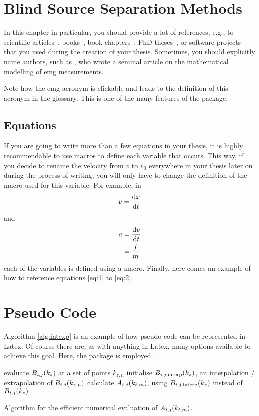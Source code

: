 \section{Blind Source Separation Methods}
In this chapter in particular, you should provide a lot of references, e.g., to scientific articles~\cite{farina99}, books~\cite{plonsey07}, book chapters~\cite{rodriguez-falces12}, PhD theses~\cite{fevotte03}, or software projects~\cite{r-project} that you used during the creation of your thesis.
Sometimes, you should explicitly name authors, such as \textcite{farina99}, who wrote a seminal article on the mathematical modelling of \gls{emg} measurements.

Note how the \gls{emg} acronym is clickable and leads to the definition of this acronym in the glossary.
This is one of the many features of the  package.

\subsection{Equations}
If you are going to write more than a few equations in your thesis, it is highly recommendable to use macros to define each variable that occurs.
This way, if you decide to rename the velocity from $v$ to $v_0$ everywhere in your thesis later on during the process of writing, you will only have to change the definition of the macro used for this variable.
For example, in
\begin{equation}
  \label{eq:1}
  v = \frac{\mathrm{d} x}{\mathrm{d} t}
\end{equation}
and
\begin{align}
  \label{eq:2}
  a &= \frac{\mathrm{d} v}{\mathrm{d} t} \nonumber \\
  &= \frac{f}{m}
\end{align}
each of the variables is defined using a macro.
Finally, here comes an example of how to reference equations \eqref{eq:1} to \eqref{eq:2}.

\section{Pseudo Code}
Algorithm \ref{alg:intexp} is an example of how pseudo code can be represented in Latex.
Of course there are, as with anything in Latex, many options available to achieve this goal.
Here, the  package is employed.
\begin{algorithm}
  \begin{algorithmic}
    \STATE evaluate $B_{i,j}(k_z)$ at a set of points $k_{z,n}$
    \STATE initialise $B_{i,j,\text{interp}}(k_z)$, an interpolation / extrapolation of $B_{i,j}(k_{z,n})$
    \STATE calculate $A_{i,j}(k_{t,m})$, using $B_{i,j,\text{interp}}(k_z)$ instead of $B_{i,j}(k_z)$
    \ENDFOR
    \ENDFOR
    \ENDFOR
  \end{algorithmic}
  \caption{Algorithm for the efficient numerical evaluation of $A_{i,j}(k_{t,m})$.}
  \label{alg:intexp}
\end{algorithm}


